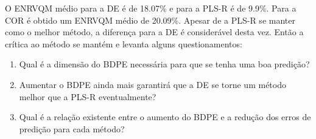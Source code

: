 O ENRVQM médio para a DE é de 18.07\% e para a PLS-R é de 9.9\%. Para a COR é obtido um ENRVQM médio de 20.09\%. Apesar de a PLS-R se manter como o melhor método, a diferença para a DE é considerável desta vez. Então a crítica ao método se mantém e levanta alguns questionamentos:
\begin{enumerate}
	\item Qual é a dimensão do BDPE necessária para que se tenha uma boa predição?
	\item Aumentar o BDPE ainda mais garantirá que a DE se torne um método melhor que a PLS-R eventualmente?
	\item Qual é a relação existente entre o aumento do BDPE e a redução dos erros de predição para cada método?
\end{enumerate}